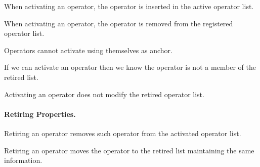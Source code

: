 \begin{theorem}
  \leanok
  \label{thm:OperatorDirectory.Properties.Actions.activate_insert_activates}
  When activating an operator, the operator is inserted in the active operator list.
\end{theorem}

\begin{theorem}
  \leanok
  \label{thm:OperatorDirectory.Properties.Actions.activate_register_removes}
  When activating an operator, the operator is removed from the registered operator list.
\end{theorem}
\begin{theorem}
  \leanok
  \label{thm:OperatorDirectory.Properties.Actions.activate_register_not_self}
  Operators cannot activate using themselves as anchor.
\end{theorem}
\begin{theorem}
  \leanok
  \label{thm:OperatorDirectory.Properties.Actions.activate_register_non_retired}
  If we can activate an operator then we know the operator is not a member of
the retired list.
\end{theorem}
\begin{theorem}
  \leanok
  \label{thm:OperatorDirectory.Properties.Actions.activate_same_retired}
  Activating an operator does not modify the retired operator list.
\end{theorem}


\paragraph*{Retiring Properties.}

\begin{theorem}
  \leanok
  \label{thm:OperatorDirectory.Properties.Actions.retired_active_substep}
  Retiring an operator removes such operator from the activated operator list.
  \end{theorem}

\begin{theorem}
  \leanok
  \label{thm:OperatorDirectory.Properties.Actions.retired_retired_step}
  Retiring an operator moves the operator to the retired list maintaining the
same information.
  \end{theorem}

